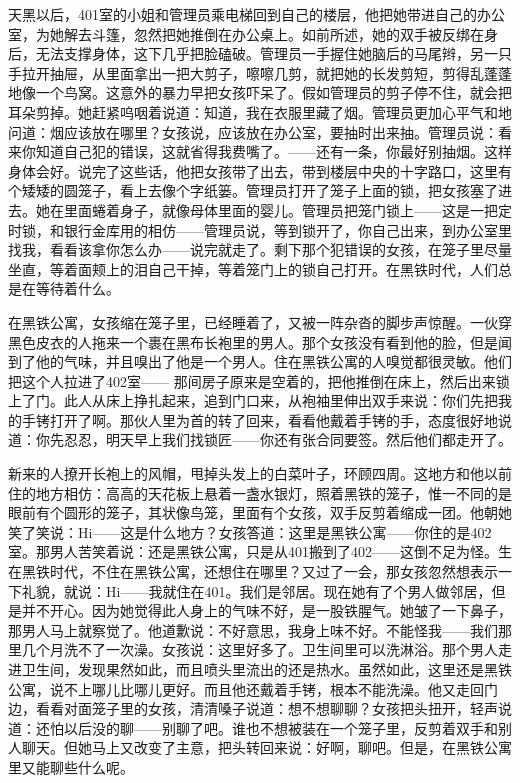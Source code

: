 天黑以后，401室的小姐和管理员乘电梯回到自己的楼层，他把她带进自己的办公室，为她解去斗篷，忽然把她推倒在办公桌上。如前所述，她的双手被反绑在身后，无法支撑身体，这下几乎把脸磕破。管理员一手握住她脑后的马尾辫，另一只手拉开抽屉，从里面拿出一把大剪子，嚓嚓几剪，就把她的长发剪短，剪得乱蓬蓬地像一个鸟窝。这意外的暴力早把女孩吓呆了。假如管理员的剪子停不住，就会把耳朵剪掉。她赶紧呜咽着说道：知道，我在衣服里藏了烟。管理员更加心平气和地问道：烟应该放在哪里？女孩说，应该放在办公室，要抽时出来抽。管理员说：看来你知道自己犯的错误，这就省得我费嘴了。——还有一条，你最好别抽烟。这样身体会好。说完了这些话，他把女孩带了出去，带到楼层中央的十字路口，这里有个矮矮的圆笼子，看上去像个字纸篓。管理员打开了笼子上面的锁，把女孩塞了进去。她在里面蜷着身子，就像母体里面的婴儿。管理员把笼门锁上——这是一把定时锁，和银行金库用的相仿——管理员说，等到锁开了，你自己出来，到办公室里找我，看看该拿你怎么办——说完就走了。剩下那个犯错误的女孩，在笼子里尽量坐直，等着面颊上的泪自己干掉，等着笼门上的锁自己打开。在黑铁时代，人们总是在等待着什么。 



在黑铁公寓，女孩缩在笼子里，已经睡着了，又被一阵杂沓的脚步声惊醒。一伙穿黑色皮衣的人拖来一个裹在黑布长袍里的男人。那个女孩没有看到他的脸，但是闻到了他的气味，并且嗅出了他是一个男人。住在黑铁公寓的人嗅觉都很灵敏。他们把这个人拉进了402室—— 那间房子原来是空着的，把他推倒在床上，然后出来锁上了门。此人从床上挣扎起来，追到门口来，从袍袖里伸出双手来说：你们先把我的手铐打开了啊。那伙人里为首的转了回来，看看他戴着手铐的手，态度很好地说道：你先忍忍，明天早上我们找锁匠——你还有张合同要签。然后他们都走开了。 

新来的人撩开长袍上的风帽，甩掉头发上的白菜叶子，环顾四周。这地方和他以前住的地方相仿：高高的天花板上悬着一盏水银灯，照着黑铁的笼子，惟一不同的是眼前有个圆形的笼子，其状像鸟笼，里面有个女孩，双手反剪着缩成一团。他朝她笑了笑说：Hi——这是什么地方？女孩答道：这里是黑铁公寓——你住的是402室。那男人苦笑着说：还是黑铁公寓，只是从401搬到了402——这倒不足为怪。生在黑铁时代，不住在黑铁公寓，还想住在哪里？又过了一会，那女孩忽然想表示一下礼貌，就说：Hi——我就住在401。我们是邻居。现在她有了个男人做邻居，但是并不开心。因为她觉得此人身上的气味不好，是一股铁腥气。她皱了一下鼻子，那男人马上就察觉了。他道歉说：不好意思，我身上味不好。不能怪我——我们那里几个月洗不了一次澡。女孩说：这里好多了。卫生间里可以洗淋浴。那个男人走进卫生间，发现果然如此，而且喷头里流出的还是热水。虽然如此，这里还是黑铁公寓，说不上哪儿比哪儿更好。而且他还戴着手铐，根本不能洗澡。他又走回门边，看看对面笼子里的女孩，清清嗓子说道：想不想聊聊？女孩把头扭开，轻声说道：还怕以后没的聊——别聊了吧。谁也不想被装在一个笼子里，反剪着双手和别人聊天。但她马上又改变了主意，把头转回来说：好啊，聊吧。但是，在黑铁公寓里又能聊些什么呢。 

